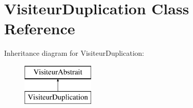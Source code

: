 \hypertarget{class_visiteur_duplication}{}\section{Visiteur\+Duplication Class Reference}
\label{class_visiteur_duplication}
Inheritance diagram for Visiteur\+Duplication\+:\begin{figure}[H]
\begin{center}
\leavevmode
\includegraphics[height=2.000000cm]{class_visiteur_duplication}
\end{center}
\end{figure}
